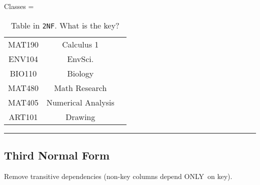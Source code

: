 \documentclass{article}
\begin{document}
\begin{table}[h!]
\caption{Table  in \texttt{2NF}.  What is the key?
   }
\begin{center}

Classes = \begin{tabular}{|c|c|c|}
   \hline
  \cellcolor{excel}{Class}  & \cellcolor{excel}{Description}
  \\
  \hline
  MAT190 & Calculus 1   \\
      \hline
 
 
 ENV104 & EnvSci.   \\
      \hline
      
    
 


BIO110 & Biology\\
      \hline
      
 MAT480 & Math Research  \\
      \hline
      
 MAT405 & Numerical Analysis   \\
      \hline
      
 ART101 & Drawing   \\
      \hline
\end{tabular}
\end{center}
\label{tab:2nf2}
\end{table}%
% 
% 
% 
 

\hspace{-0.5cm}\rule[-0.101in]{\textwidth}{0.0025in}
  
 





























 
 
 \subsection*{Third Normal Form}
 Remove transitive dependencies (non-key columns depend ONLY\ on key).
  
\end{document}
